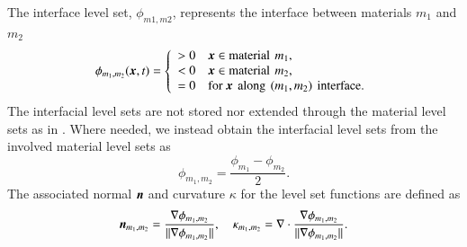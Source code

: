 \documentclass[preprint,12pt]{Definitions/elsarticle}
\newcommand{\tn}{\textnormal}
\newcommand{\bmx}{\mbox{\boldmath $x$\unboldmath}}
\newcommand{\bmn}{\mbox{\boldmath $n$\unboldmath}}
\begin{document}
\noindent The interface level set, $\phi_{m1,m2}$,
represents the interface between materials
$m_1$ and $m_2$
\begin{equation}
\phi_{m_1,m_2}(\bmx,t) = \left\{
\begin{array}{ll}
> 0 & \bmx \in \tn{material}\,\: m_1, \\ 
< 0 & \bmx \in \tn{material}\,\: m_2, \\ 
= 0 & \tn{for }\bmx\,\: \tn{along}\,\:(m_1,m_2)\,\:\tn{interface}. \\ 
\end{array}
\right.
\end{equation}
The interfacial level sets are not stored nor extended through the material level sets as in \cite{yeETAL2023CMOF}. Where needed, we instead obtain the interfacial level sets from the involved material level sets as
\begin{equation}
\phi_{m_1,m_2} = \frac{\phi_{m_1}-\phi_{m_2}}{2}.
\end{equation}
The associated normal $\bmn$ and curvature $\kappa$ for the level set functions are defined as
\begin{equation}
\bmn_{m_1,m_2} = 
\frac{\nabla \phi_{m_1,m_2}}{||\nabla \phi_{m_1,m_2}||}, \hspace{10pt}   
\kappa_{m_1,m_2} = 
\nabla \cdot \frac{\nabla \phi_{m_1,m_2}}{||\nabla \phi_{m_1,m_2}||}.
\end{equation}
\end{document}
